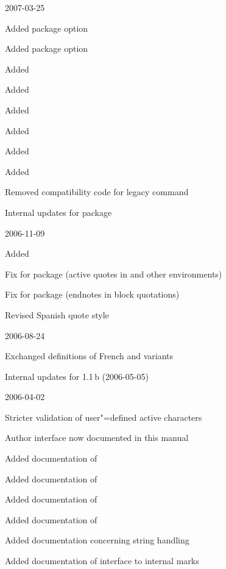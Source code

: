\documentclass{ltxdockit}[2010/09/26]
\begin{document}
\begin{changelog}
\begin{release}{3.7}{2007-03-25}
\item Added package option 
\item Added package option 
\item Added 
\item Added 
\item Added 
\item Added 
\item Added 
\item Added 
\item Removed compatibility code for  legacy command
\item Internal updates for  package
\end{release}

\begin{release}{3.6}{2006-11-09}
\item Added 
\item Fix for  package (active quotes in  and other environments)
\item Fix for  package (endnotes in block quotations)
\item Revised Spanish quote style
\end{release}

\begin{release}{3.5}{2006-08-24}
\item Exchanged definitions of French  and  variants
\item Internal updates for  1.1\,b (2006-05-05)
\end{release}

\begin{release}{3.4}{2006-04-02}
\item Stricter validation of user"=defined active characters
\item Author interface now documented in this manual
\item Added documentation of 
\item Added documentation of 
\item Added documentation of 
\item Added documentation of 
\item Added documentation concerning string handling 
\item Added documentation of interface to internal marks
\end{release}


\end{changelog}
\end{document}
